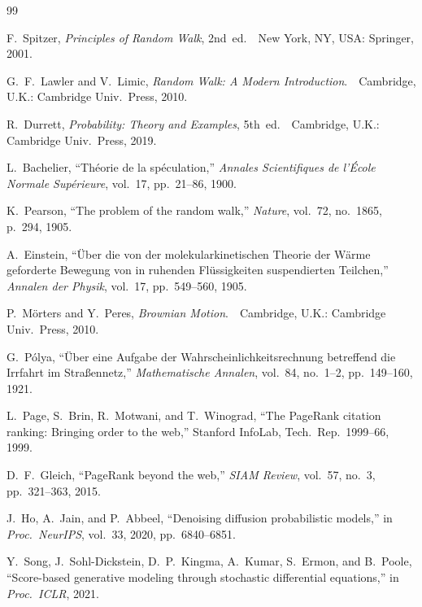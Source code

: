 \documentclass[conference,a4paper,10pt]{IEEEtran}
\begin{document}

\begin{thebibliography}{99}
\scriptsize
\setlength{\itemsep}{-1pt}
\setlength{\parsep}{0pt}
\setlength{\parskip}{0pt}

F.~Spitzer, \emph{Principles of Random Walk}, 2nd~ed.\ \ New York, NY, USA:
Springer, 2001.

G.~F.~Lawler and V.~Limic, \emph{Random Walk: A Modern Introduction}.\ \
Cambridge, U.K.: Cambridge Univ.\ Press, 2010.

R.~Durrett, \emph{Probability: Theory and Examples}, 5th~ed.\ \ Cambridge,
U.K.: Cambridge Univ.\ Press, 2019.

L.~Bachelier, ``Th\'{e}orie de la sp\'{e}culation,'' \emph{Annales
Scientifiques de l'\'{E}cole Normale Sup\'{e}rieure}, vol.~17,
pp.~21--86, 1900.

K.~Pearson, ``The problem of the random walk,'' \emph{Nature}, vol.~72,
no.~1865, p.~294, 1905.

A.~Einstein, ``\"{U}ber die von der molekularkinetischen Theorie der
W\"{a}rme geforderte Bewegung von in ruhenden Fl\"{u}ssigkeiten
suspendierten Teilchen,'' \emph{Annalen der Physik}, vol.~17,
pp.~549--560, 1905.

P.~M\"{o}rters and Y.~Peres, \emph{Brownian Motion}.\ \ Cambridge, U.K.:
Cambridge Univ.\ Press, 2010.

G.~P\'{o}lya, ``\"{U}ber eine Aufgabe der Wahrscheinlichkeitsrechnung
betreffend die Irrfahrt im Stra\ss ennetz,'' \emph{Mathematische Annalen},
vol.~84, no.~1--2, pp.~149--160, 1921.

L.~Page, S.~Brin, R.~Motwani, and T.~Winograd, ``The PageRank citation
ranking: Bringing order to the web,'' Stanford InfoLab, Tech.\ Rep.\
1999--66, 1999.

D.~F.~Gleich, ``PageRank beyond the web,'' \emph{SIAM Review}, vol.~57,
no.~3, pp.~321--363, 2015.

J.~Ho, A.~Jain, and P.~Abbeel, ``Denoising diffusion probabilistic
models,'' in \emph{Proc.\ NeurIPS}, vol.~33, 2020, pp.~6840--6851.

\bibitem{song2021scorebased}
Y.~Song, J.~Sohl-Dickstein, D.~P.~Kingma, A.~Kumar, S.~Ermon, and B.~Poole,
``Score-based generative modeling through stochastic differential
equations,'' in \emph{Proc.\ ICLR}, 2021.


\end{thebibliography}
\end{document}

